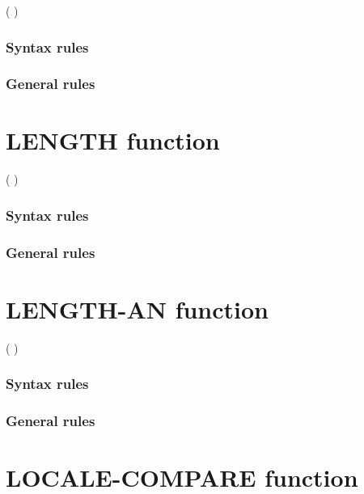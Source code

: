 \begin{syntax}
    ( \argument )
\end{syntax}

\subsubsection{Syntax rules}

\subsubsection{General rules}

\section{LENGTH function}

\begin{syntax}
    ( \argument
  )
\end{syntax}

\subsubsection{Syntax rules}

\subsubsection{General rules}

\section{LENGTH-AN function}

\begin{syntax}[\miscextcolour]
    ( \argument )
\end{syntax}

\subsubsection{Syntax rules}

\subsubsection{General rules}

\section{LOCALE-COMPARE function}

